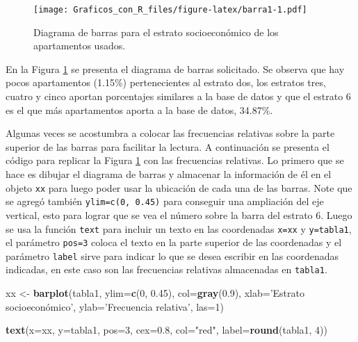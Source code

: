 \documentclass[10pt,]{krantz}
\makeatletter
\newenvironment{Shaded}{\begin{snugshade}}{\end{snugshade}}
\newcommand{\KeywordTok}[1]{\textcolor[rgb]{0.13,0.29,0.53}{\textbf{{#1}}}}
\newcommand{\DataTypeTok}[1]{\textcolor[rgb]{0.13,0.29,0.53}{{#1}}}
\newcommand{\DecValTok}[1]{\textcolor[rgb]{0.00,0.00,0.81}{{#1}}}
\newcommand{\FloatTok}[1]{\textcolor[rgb]{0.00,0.00,0.81}{{#1}}}
\newcommand{\StringTok}[1]{\textcolor[rgb]{0.31,0.60,0.02}{{#1}}}
\newcommand{\NormalTok}[1]{{#1}}
\newenvironment{kframe}{%
\medskip{}
\setlength{\fboxsep}{.8em}
 \def\at@end@of@kframe{}%
 \ifinner\ifhmode%
  \def\at@end@of@kframe{\end{minipage}}%
  \begin{minipage}{\columnwidth}%
 \fi\fi%
 \def\FrameCommand##1{\hskip\@totalleftmargin \hskip-\fboxsep
 \colorbox{shadecolor}{##1}\hskip-\fboxsep
     \hskip-\linewidth \hskip-\@totalleftmargin \hskip\columnwidth}%
 \MakeFramed {\advance\hsize-\width
   \@totalleftmargin\z@ \linewidth\hsize
   \@setminipage}}%
 {\par\unskip\endMakeFramed%
 \at@end@of@kframe}
\renewenvironment{Shaded}{\begin{kframe}}{\end{kframe}}
\makeatother
\begin{document}
\begin{figure}[htbp]
\centering
\texttt{[image: Graficos\_con\_R\_files/figure-latex/barra1-1.pdf]}
\caption{\label{fig:barra1}Diagrama de barras para el estrato socioeconómico
de los apartamentos usados.}
\end{figure}

En la Figura \ref{fig:barra1} se presenta el diagrama de barras
solicitado. Se observa que hay pocos apartamentos (1.15\%)
pertenecientes al estrato dos, los estratos tres, cuatro y cinco aportan
porcentajes similares a la base de datos y que el estrato 6 es el que
más apartamentos aporta a la base de datos, 34.87\%.

Algunas veces se acostumbra a colocar las frecuencias relativas sobre la
parte superior de las barras para facilitar la lectura. A continuación
se presenta el código para replicar la Figura \ref{fig:barra1} con las
frecuencias relativas. Lo primero que se hace es dibujar el diagrama de
barras y almacenar la información de él en el objeto \texttt{xx} para
luego poder usar la ubicación de cada una de las barras. Note que se
agregó también \texttt{ylim=c(0,\ 0.45)} para conseguir una ampliación
del eje vertical, esto para lograr que se vea el número sobre la barra
del estrato 6. Luego se usa la función \texttt{text} para incluir un
texto en las coordenadas \texttt{x=xx} y \texttt{y=tabla1}, el parámetro
\texttt{pos=3} coloca el texto en la parte superior de las coordenadas y
el parámetro \texttt{label} sirve para indicar lo que se desea escribir
en las coordenadas indicadas, en este caso son las frecuencias relativas
almacenadas en \texttt{tabla1}.

\begin{Shaded}
\begin{Highlighting}[]
\NormalTok{xx <-}\StringTok{ }\KeywordTok{barplot}\NormalTok{(tabla1, }\DataTypeTok{ylim=}\KeywordTok{c}\NormalTok{(}\DecValTok{0}\NormalTok{, }\FloatTok{0.45}\NormalTok{), }\DataTypeTok{col=}\KeywordTok{gray}\NormalTok{(}\FloatTok{0.9}\NormalTok{),}
              \DataTypeTok{xlab=}\StringTok{'Estrato socioeconómico'}\NormalTok{,}
              \DataTypeTok{ylab=}\StringTok{'Frecuencia relativa'}\NormalTok{, }\DataTypeTok{las=}\DecValTok{1}\NormalTok{)}

\KeywordTok{text}\NormalTok{(}\DataTypeTok{x=}\NormalTok{xx, }\DataTypeTok{y=}\NormalTok{tabla1, }\DataTypeTok{pos=}\DecValTok{3}\NormalTok{, }\DataTypeTok{cex=}\FloatTok{0.8}\NormalTok{, }\DataTypeTok{col=}\StringTok{"red"}\NormalTok{,}
     \DataTypeTok{label=}\KeywordTok{round}\NormalTok{(tabla1, }\DecValTok{4}\NormalTok{))}
\end{Highlighting}
\end{Shaded}
\end{document}
